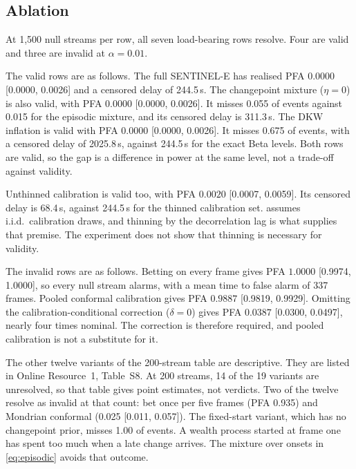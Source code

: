 \subsection{Ablation}
\label{sec:ablation}


At 1,500 null streams per row, all seven load-bearing rows resolve. Four are
valid and three are invalid at $\alpha=0.01$.

The valid rows are as follows. The full SENTINEL-E has realised PFA
$0.0000$ [0.0000, 0.0026] and a censored delay of 244.5\,s. The changepoint
mixture ($\eta=0$) is also valid, with PFA $0.0000$ [0.0000, 0.0026]. It misses
0.055 of events against 0.015 for the episodic mixture, and its censored delay
is 311.3\,s. The DKW inflation is valid with PFA $0.0000$ [0.0000, 0.0026]. It
misses 0.675 of events, with a censored delay of 2025.8\,s, against 244.5\,s for
the exact Beta levels. Both rows are valid, so the gap is a difference in power
at the same level, not a trade-off against validity.

Unthinned calibration is valid too, with PFA $0.0020$ [0.0007, 0.0059]. Its
censored delay is 68.4\,s, against 244.5\,s for the thinned calibration set.
 assumes i.i.d.\ calibration draws, and thinning by the
decorrelation lag is what supplies that premise. The experiment does not show
that thinning is necessary for validity.

The invalid rows are as follows. Betting on every frame gives PFA $1.0000$
[0.9974, 1.0000], so every null stream alarms, with a mean time to false alarm
of 337 frames. Pooled conformal calibration gives PFA $0.9887$ [0.9819, 0.9929].
Omitting the calibration-conditional correction ($\delta=0$) gives PFA
$0.0387$ [0.0300, 0.0497], nearly four times nominal. The correction is therefore required, and pooled calibration is not a substitute for it.

The other twelve variants of the 200-stream table are descriptive. They are
listed in Online Resource~1, Table~S8. At 200 streams, 14 of the 19 variants are
unresolved, so that table gives point estimates, not verdicts. Two of the twelve
resolve as invalid at that count: bet once per five frames (PFA 0.935) and
Mondrian conformal (0.025 [0.011, 0.057]). The fixed-start variant, which has no
changepoint prior, misses 1.00 of events. A wealth process started at frame one
has spent too much when a late change arrives. The mixture over onsets in
\cref{eq:episodic} avoids that outcome.
